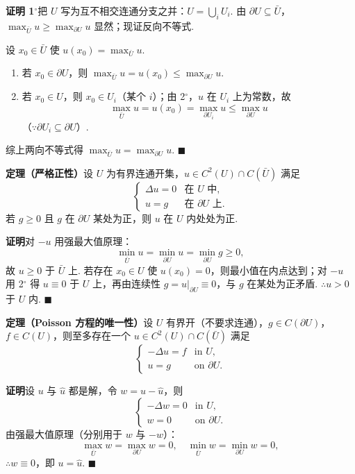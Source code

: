 \documentclass{article}
\begin{document}
\noindent\textbf{证明 1$^\circ$}\quad 把 $U$ 写为互不相交连通分支之并：$U = \bigcup_i U_i$. 由 $\partial U \subseteq \bar{U}$，$\max_{\bar{U}} u \geq \max_{\partial U} u$ 显然；现证反向不等式.

设 $x_0 \in \bar{U}$ 使 $u(x_0) = \max_{\bar{U}} u$.
\begin{enumerate}[label=\arabic*$^\circ$, left=0pt]
	
	\item 若 $x_0 \in \partial U$，则 $\max_{\bar{U}} u = u(x_0) \leq \max_{\partial U} u$.
	\item 若 $x_0 \in U$，则 $x_0 \in U_i$（某个 $i$）；由 2$^\circ$，$u$ 在 $U_i$ 上为常数，故
	\[
	\max_{\bar{U}} u = u(x_0) = \max_{\partial U_i} u \leq \max_{\partial U} u
	\]
	（$\because \partial U_i \subseteq \partial U$）.
\end{enumerate}
综上两向不等式得 $\max_{\bar{U}} u = \max_{\partial U} u$. $\blacksquare$

\noindent\textbf{定理（严格正性）}\quad 设 $U$ 为有界连通开集，$u \in C^2(U) \cap C(\bar{U})$ 满足
\[
\begin{cases}
	\Delta u = 0 & \text{在 } U \text{ 中}, \\
	u = g & \text{在 } \partial U \text{ 上}.
\end{cases}
\]
若 $g \geq 0$ 且 $g$ 在 $\partial U$ 某处为正，则 $u$ 在 $U$ 内处处为正.

\noindent\textbf{证明}\quad 对 $-u$ 用强最大值原理：
\[
\min_{\bar{U}} u = \min_{\partial U} u = \min_{\partial U} g \geq 0,
\]
故 $u \geq 0$ 于 $\bar{U}$ 上. 若存在 $x_0 \in U$ 使 $u(x_0) = 0$，则最小值在内点达到；对 $-u$ 用 2$^\circ$ 得 $u \equiv 0$ 于 $U$ 上，再由连续性 $g = u|_{\partial U} \equiv 0$，与 $g$ 在某处为正矛盾. $\therefore u > 0$ 于 $U$ 内. $\blacksquare$

\noindent\textbf{定理（Poisson 方程的唯一性）}\quad 设 $U$ 有界开（不要求连通），$g \in C(\partial U)$，$f \in C(U)$，则至多存在一个 $u \in C^2(U) \cap C(\bar{U})$ 满足
\[
\begin{cases}
	-\Delta u = f & \text{in } U, \\
	u = g & \text{on } \partial U.
\end{cases}
\]

\noindent\textbf{证明}\quad 设 $u$ 与 $\hat{u}$ 都是解，令 $w = u - \hat{u}$，则
\[
\begin{cases}
	-\Delta w = 0 & \text{in } U, \\
	w = 0 & \text{on } \partial U.
\end{cases}
\]
由强最大值原理（分别用于 $w$ 与 $-w$）：
\[
\max_{\bar{U}} w = \max_{\partial U} w = 0, \quad \min_{\bar{U}} w = \min_{\partial U} w = 0,
\]
$\therefore w \equiv 0$，即 $u = \hat{u}$. $\blacksquare$
\end{document}
